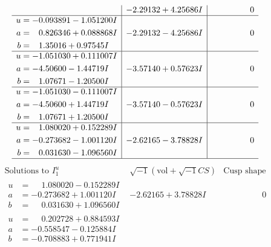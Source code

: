 \documentclass[1p]{elsarticle_modified}
\theoremstyle{definition}
\newcommand{\I}{\sqrt{-1}}
\begin{document}
$$\begin{array}{c|c|c}
 & -2.29132 + 4.25686 I & \phantom{-0.000000 } 0 \\ \hline\begin{aligned}
u &= -0.093891 - 1.051200 I \\
a &= \phantom{-}0.826346 + 0.088868 I \\
b &= \phantom{-}1.35016 + 0.97545 I\end{aligned}
 & -2.29132 - 4.25686 I & \phantom{-0.000000 } 0 \\ \hline\begin{aligned}
u &= -1.051030 + 0.111007 I \\
a &= -4.50600 - 1.44719 I \\
b &= \phantom{-}1.07671 - 1.20500 I\end{aligned}
 & -3.57140 + 0.57623 I & \phantom{-0.000000 } 0 \\ \hline\begin{aligned}
u &= -1.051030 - 0.111007 I \\
a &= -4.50600 + 1.44719 I \\
b &= \phantom{-}1.07671 + 1.20500 I\end{aligned}
 & -3.57140 - 0.57623 I & \phantom{-0.000000 } 0 \\ \hline\begin{aligned}
u &= \phantom{-}1.080020 + 0.152289 I \\
a &= -0.273682 - 1.001120 I \\
b &= \phantom{-}0.031630 - 1.096560 I\end{aligned}
 & -2.62165 - 3.78828 I & \phantom{-0.000000 } 0\\
 \hline 
 \end{array}$$\newpage$$\begin{array}{c|c|c}  
\text{Solutions to }I^u_{1}& \I (\text{vol} + \sqrt{-1}CS) & \text{Cusp shape}\\
 \hline 
\begin{aligned}
u &= \phantom{-}1.080020 - 0.152289 I \\
a &= -0.273682 + 1.001120 I \\
b &= \phantom{-}0.031630 + 1.096560 I\end{aligned}
 & -2.62165 + 3.78828 I & \phantom{-0.000000 } 0 \\ \hline\begin{aligned}
u &= \phantom{-}0.202728 + 0.884593 I \\
a &= -0.558547 - 0.125884 I \\
b &= -0.708883 + 0.771941 I\end{aligned}

\end{array}$$
\end{document}
